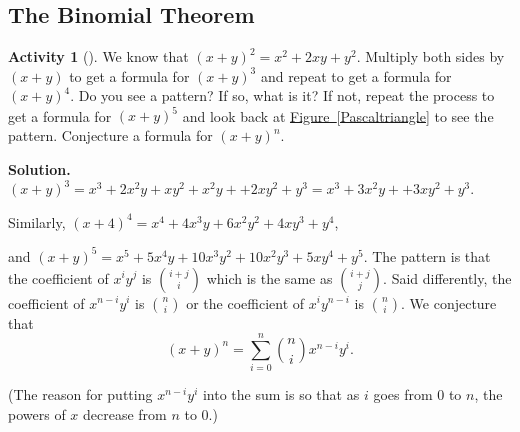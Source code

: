 \documentclass[10pt,]{book}
\theoremstyle{plain}
\theoremstyle{definition}
\newtheorem{activity}[project]{Activity}
\numberwithin{equation}{chapter}
\begin{document}
\subsection[{The Binomial Theorem}]{The Binomial Theorem}\label{subsection-8}
\begin{activity}[]\label{Conjecturebinomthm}
We know that \((x+y)^2 = x^2+2xy+y^2\). Multiply both sides by \((x+y)\) to get a formula for \((x+y)^3\) and repeat to get a formula for \((x+y)^4\). Do you see a pattern? If so, what is it? If not, repeat the process to get a formula for \((x+y)^5\) and look back at \hyperref[Pascaltriangle]{Figure~\ref{Pascaltriangle}} to see the pattern. Conjecture a formula for \((x+y)^n\).%
\par\medskip\noindent%
\textbf{Solution.}\quad \((x+y)^3=x^3+2x^2y +xy^2+x^2y+ +2xy^2 +y^3=x^3+3x^2y++3xy^2+y^3\).%
\par
Similarly, \((x+4)^4=x^4+4x^3y+6x^2y^2+4xy^3+y^4\),%
\par
and \((x+y)^5=x^5+5x^4y+10x^3y^2+10x^2y^3+5xy^4+y^5.\) The pattern is that the coefficient of \(x^iy^j\) is \(\binom{i+j}{i}\) which is the same as \(\binom{i+j}{j}\). Said differently, the coefficient of \(x^{n-i}y^i\) is \(\binom{n}{i}\) or the coefficient of \(x^iy^{n-i}\) is \(\binom{n}{i}\). We conjecture that%
\begin{equation*}
(x+y)^n=\sum_{i=0}^n \binom{n}{i}x^{n-i}y^i.
\end{equation*}
%
\par
(The reason for putting \(x^{n-i}y^i\) into the sum is so that as \(i\) goes from 0 to \(n\), the powers of \(x\) decrease from \(n\) to 0.)%
\end{activity}
\end{document}

